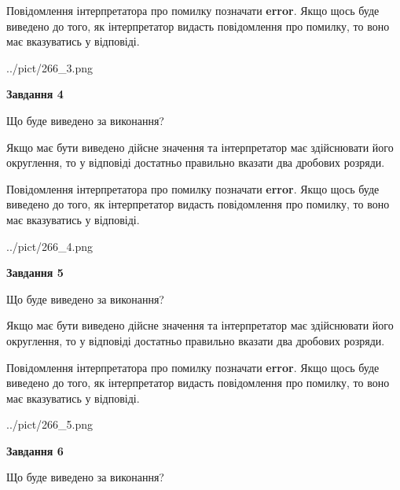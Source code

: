 \documentclass[12pt, ukrainian]{article}
\begin{document}
{\begin {Large}
Повідомлення інтерпретатора про помилку позначати \textbf{error}.
Якщо щось буде виведено до того, як інтерпретатор видасть повідомлення про помилку, 
то воно має вказуватись у відповіді. \par

\begin{center}
	{../pict/266_3.png}
\end{center}
\newpage

{\begin {center}\textbf{Завдання 4}\end {center}}\par
Що буде виведено за виконання? \par

Якщо має бути виведено дійсне значення та інтерпретатор має здійснювати його округлення, 
то у відповіді достатньо правильно вказати два дробових розряди.

Повідомлення інтерпретатора про помилку позначати \textbf{error}.
Якщо щось буде виведено до того, як інтерпретатор видасть повідомлення про помилку, 
то воно має вказуватись у відповіді. \par

\begin{center}
	{../pict/266_4.png}
\end{center}
\newpage

{\begin {center}\textbf{Завдання 5}\end {center}}\par
Що буде виведено за виконання? \par

Якщо має бути виведено дійсне значення та інтерпретатор має здійснювати його округлення, 
то у відповіді достатньо правильно вказати два дробових розряди.

Повідомлення інтерпретатора про помилку позначати \textbf{error}.
Якщо щось буде виведено до того, як інтерпретатор видасть повідомлення про помилку, 
то воно має вказуватись у відповіді. \par

\begin{center}
	{../pict/266_5.png}
\end{center}
\newpage

{\begin {center}\textbf{Завдання 6}\end {center}}\par
Що буде виведено за виконання? \par


\end{Large}}
\end{document}
